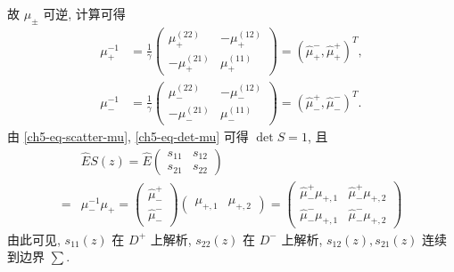 故 $\mu_{\pm}$ 可逆, 计算可得
\begin{align}
    \mu_{+}^{-1} & = \frac{1}{\gamma} \begin{pmatrix} \mu_{+}^{(22)} & -\mu_{+}^{(12)} \\ -\mu_{+}^{(21)} & \mu_{+}^{(11)} \end{pmatrix} = (\hat{\mu}_{+}^{-}, \hat{\mu}_{+}^{+})^{T}, \\
    \mu_{-}^{-1} & = \frac{1}{\gamma} \begin{pmatrix} \mu_{-}^{(22)} & -\mu_{-}^{(12)} \\ -\mu_{-}^{(21)} & \mu_{-}^{(11)} \end{pmatrix} = (\hat{\mu}_{-}^{+}, \hat{\mu}_{-}^{-})^{T}.
\end{align}
由 \eqref{ch5-eq-scatter-mu}, \eqref{ch5-eq-det-mu} 可得 $ \det{S} = 1 $, 且
\begin{equation}
    \begin{aligned}
          & \hat{E} S(z) = \hat{E} \begin{pmatrix} s_{11} & s_{12} \\ s_{21} & s_{22} \end{pmatrix}                                                                                                                                                                                                            \\
        = & \mu_{-}^{-1} \mu_{+} = \begin{pmatrix} \hat{\mu}_{-}^{+} \\ \hat{\mu}_{-}^{-} \end{pmatrix} \begin{pmatrix} \mu_{+,1} & \mu_{+,2} \end{pmatrix} = \begin{pmatrix} \hat{\mu}_{-}^{+}\mu_{+,1} & \hat{\mu}_{-}^{+}\mu_{+,2} \\ \hat{\mu}_{-}^{-}\mu_{+,1} & \hat{\mu}_{-}^{-}\mu_{+,2} \end{pmatrix}
    \end{aligned}
\end{equation}
由此可见, $ s_{11}(z) $ 在 $D^{+}$ 上解析, $ s_{22}(z)$ 在 $D^{-}$ 上解析, $s_{12}(z), s_{21}(z)$ 连续到边界 $ \sum $.

